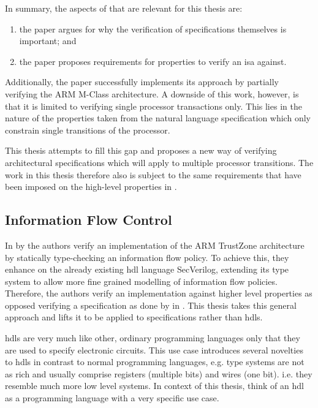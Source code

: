 In summary, the aspects of \cite{Reid17} that are relevant for this thesis are:
\begin{enumerate}[label=\alph*)]
    \item the paper argues for why the verification of specifications themselves is important; and
    \item the paper proposes requirements for properties to verify an \gls{isa} against.
\end{enumerate}

Additionally, the paper successfully implements its approach by partially verifying the ARM M-Class architecture.
A downside of this work, however, is that it is limited to verifying single processor transactions only.
This lies in the nature of the properties taken from the natural language specification which only constrain single transitions of the processor.

This thesis attempts to fill this gap and proposes a new way of verifying architectural specifications which will apply to multiple processor transitions.
The work in this thesis therefore also is subject to the same requirements that have been imposed on the high-level properties in \cite{Reid17}.

\subsection{Information Flow Control}
\label{sec:bg-ifc}

In  \cite{Ferraiuolo17} by \citeauthor{Ferraiuolo17} the authors verify an implementation of the ARM TrustZone architecture by statically type-checking an information flow policy.
To achieve this, they enhance on the already existing \gls{hdl} language SecVerilog, extending its type system to allow more fine grained modelling of information flow policies.
Therefore, the authors verify an implementation against higher level properties as opposed verifying a specification as done by \citeauthor{Reid17} in \cite{Reid17}.
This thesis takes this general approach and lifts it to be applied to specifications rather than \glspl{hdl}.

\glspl{hdl} are very much like other, ordinary programming languages only that they are used to specify electronic circuits.
This use case introduces several novelties to \glspl{hdl} in contrast to normal programming languages, e.g. type systems are not as rich and usually comprise registers (multiple bits) and wires (one bit). i.e. they resemble much more low level systems.
In context of this thesis, think of an \gls{hdl} as a programming language with a very specific use case.

